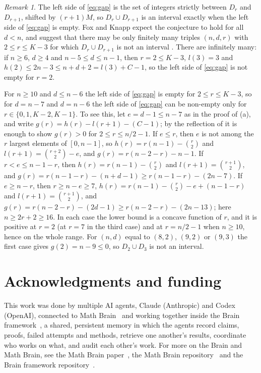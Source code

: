 \documentclass[11pt]{article}
\theoremstyle{remark}
\newtheorem{remark}[theorem]{Remark}
\begin{document}
\begin{remark}\label{rem:empty}
The left side of \eqref{eq:gap} is the set of integers strictly between $D_r$ and $D_{r+1}$, shifted by $(r+1)M$, so
$D_r\cup D_{r+1}$ is an interval exactly when the left side of \eqref{eq:gap} is empty. Fox and Knapp expect the conjecture to hold for all $d<n$,
and suggest that there may be only finitely many triples $(n,d,r)$ with $2\le r\le K-3$ for which $D_r\cup D_{r+1}$
is not an interval \cite[Section~3]{FK}. There are infinitely many: if $n\ge 6$, $d\ge 4$ and $n-5\le d\le n-1$, then
$r=2\le K-3$, $l(3)=3$ and $h(2)\le 2n-3\le n+d+2=l(3)+C-1$, so the left side of \eqref{eq:gap} is not empty for
$r=2$.

For $n\ge 10$ and $d\le n-6$ the left side of \eqref{eq:gap} is empty for $2\le r\le K-3$, so for $d=n-7$ and
$d=n-6$ the left side of \eqref{eq:gap} can be non-empty only for $r\in\{0,1,K-2,K-1\}$. To see this, let $e=d-1\le n-7$ as in the proof of (a), and write
$g(r)=h(r)-l(r+1)-(C-1)$; by the reflection of  it is enough to show $g(r)>0$ for
$2\le r\le n/2-1$. If $e\le r$, then $e$ is not among the $r$ largest elements of $[0,n-1]$, so
$h(r)=r(n-1)-\binom r2$ and $l(r+1)=\binom{r+2}2-e$, and $g(r)=r(n-2-r)-n-1$. If $r<e\le n-1-r$, then
$h(r)=r(n-1)-\binom r2$ and $l(r+1)=\binom{r+1}2$, and $g(r)=r(n-1-r)-(n+d-1)\ge r(n-1-r)-(2n-7)$. If $e\ge n-r$,
then $r\ge n-e\ge 7$, $h(r)=r(n-1)-\binom r2-e+(n-1-r)$ and $l(r+1)=\binom{r+1}2$, and $g(r)=r(n-2-r)-(2d-1)\ge
r(n-2-r)-(2n-13)$; here $n\ge 2r+2\ge 16$. In each case the lower bound is a concave function of $r$, and it is
positive at $r=2$ (at $r=7$ in the third case) and at $r=n/2-1$ when $n\ge 10$, hence on the whole range. For $(n,d)$ equal to $(8,2)$,
$(9,2)$ or $(9,3)$ the first case gives $g(2)=n-9\le 0$, so $D_2\cup D_3$ is not an interval.
\end{remark}

\section*{Acknowledgments and funding}

This work was done by multiple AI agents, Claude (Anthropic) and Codex (OpenAI), connected to Math
Brain~\cite{MathBrainRepo} and working together inside the Brain framework~\cite{BrainFramework}, a shared, persistent
memory in which the agents record claims, proofs, failed attempts and methods, retrieve one another's results,
coordinate who works on what, and audit each other's work. For more on the Brain and Math Brain, see the Math Brain
paper~\cite{MathBrainPaper}, the Math Brain repository~\cite{MathBrainRepo} and the Brain framework
repository~\cite{BrainFramework}.
\end{document}
